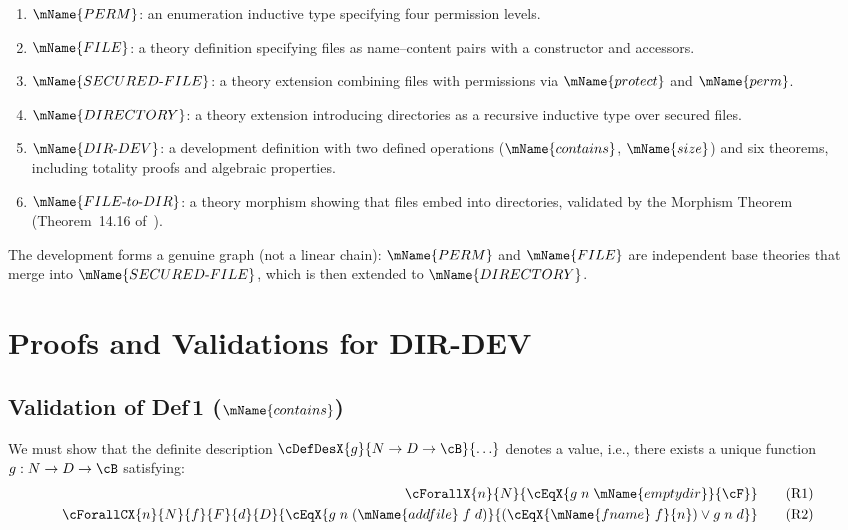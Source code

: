 \documentclass[11pt]{article}
\newcommand{\PERM}{\mName{PERM}}
\newcommand{\FILETYPE}{\mName{FILE}}
\newcommand{\SECFILE}{\mName{SECURED\text{-}FILE}}
\newcommand{\DIR}{\mName{DIRECTORY}}
\newcommand{\DIRDEV}{\mName{DIR\text{-}DEV}}
\newcommand{\fname}{\mName{fname}}
\newcommand{\perm}{\mName{perm}}
\newcommand{\prot}{\mName{protect}}
\begin{document}
\begin{enumerate}
  \item $\PERM$: an enumeration inductive type specifying four
    permission levels.
  \item $\FILETYPE$: a theory definition specifying files as
    name--content pairs with a constructor and accessors.
  \item $\SECFILE$: a theory extension combining files with
    permissions via $\prot$ and $\perm$.
  \item $\DIR$: a theory extension introducing directories as a
    recursive inductive type over secured files.
  \item $\DIRDEV$: a development definition with two defined
    operations ($\mName{contains}$, $\mName{size}$) and six
    theorems, including totality proofs and algebraic properties.
  \item $\mName{FILE\text{-}to\text{-}DIR}$: a theory morphism
    showing that files embed into directories, validated by the
    Morphism Theorem (Theorem~14.16 of~\cite{farmer2025}).
\end{enumerate}

The development forms a genuine graph (not a linear chain):
$\PERM$ and $\FILETYPE$ are independent base theories that merge
into $\SECFILE$, which is then extended to $\DIR$.


\appendix
\newpage
\section{Proofs and Validations for DIR-DEV}
\label{app:proofs}

\subsection{Validation of Def\,1 ($\mName{contains}$)}

We must show that the definite description
$\cDefDesX{g}{N \to D \to \cB}{\ldots}$
denotes a value, i.e., there exists a unique function
$g : N \to D \to \cB$ satisfying:
\begin{align}
  \cForallX{n}{N}{\cEqX{g\;n\;\mName{emptydir}}{\cF}} \tag{R1} \\
  \cForallCX{n}{N}{f}{F}{d}{D}{
    \cEqX{g\;n\;(\mName{addfile}\;f\;d)}{
      (\cEqX{\fname\;f}{n}) \vee g\;n\;d}}
    \tag{R2}
\end{align}
\end{document}
